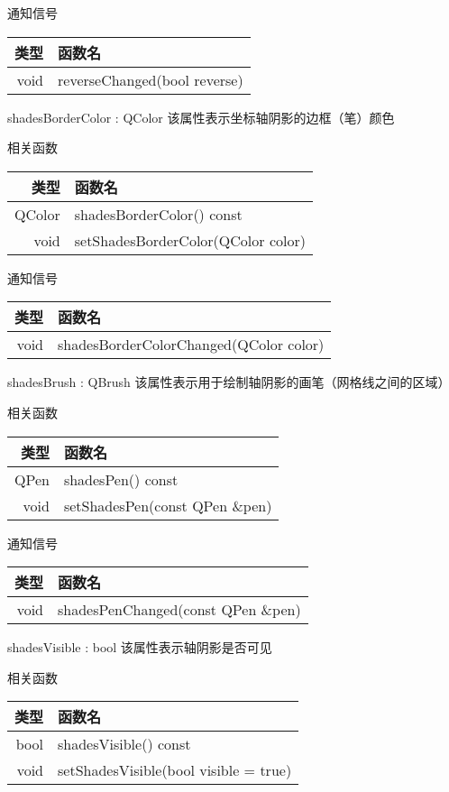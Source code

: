 通知信号

\begin{tabular}{|r|l|}
\hline
类型&函数名\\ 
\hline
void&	reverseChanged(bool reverse)\\
\hline
\end{tabular}

\splitLine %
 
shadesBorderColor : QColor 该属性表示坐标轴阴影的边框（笔）颜色

相关函数

\begin{tabular}{|r|l|}
\hline
类型&函数名\\ 
\hline
QColor	&shadesBorderColor() const\\
\hline
void&	setShadesBorderColor(QColor color)\\
\hline
\end{tabular}

通知信号

\begin{tabular}{|r|l|}
\hline
类型&函数名\\ 
\hline
void& shadesBorderColorChanged(QColor color)\\
\hline
\end{tabular}

\splitLine


shadesBrush : QBrush 该属性表示用于绘制轴阴影的画笔（网格线之间的区域）

相关函数

\begin{tabular}{|r|l|}
\hline
类型&函数名\\ 
\hline
QPen&	shadesPen() const\\
\hline
void& setShadesPen(const QPen \&pen)\\
\hline
\end{tabular}

通知信号

\begin{tabular}{|r|l|}
\hline
类型&函数名\\ 
\hline
void& 	shadesPenChanged(const QPen \&pen)\\
\hline
\end{tabular}

\splitLine

shadesVisible : bool 该属性表示轴阴影是否可见

相关函数

\begin{tabular}{|r|l|}
\hline
类型&函数名\\ 
\hline
bool& 	shadesVisible() const\\
\hline
void & setShadesVisible(bool visible = true)\\
\hline
\end{tabular}

